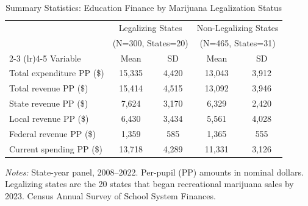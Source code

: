 
\begin{table}[htbp]
\centering
\caption{Summary Statistics: Education Finance by Marijuana Legalization Status}
\label{tab:summary}
\small
\begin{tabular}{lcccc}
\hline\hline
 & \multicolumn{2}{c}{Legalizing States} & \multicolumn{2}{c}{Non-Legalizing States} \\
 & \multicolumn{2}{c}{(N=300, States=20)} & \multicolumn{2}{c}{(N=465, States=31)} \\
\cmidrule(lr){2-3} \cmidrule(lr){4-5}
Variable & Mean & SD & Mean & SD \\
\hline
Total expenditure PP (\$) & 15,335 & 4,420 & 13,043 & 3,912 \\
Total revenue PP (\$) & 15,414 & 4,515 & 13,092 & 3,946 \\
State revenue PP (\$) & 7,624 & 3,170 & 6,329 & 2,420 \\
Local revenue PP (\$) & 6,430 & 3,434 & 5,561 & 4,028 \\
Federal revenue PP (\$) & 1,359 & 585 & 1,365 & 555 \\
Current spending PP (\$) & 13,718 & 4,289 & 11,331 & 3,126 \\
\hline\hline
\end{tabular}
\begin{tablenotes}
\small
\item \textit{Notes:} State-year panel, 2008--2022. Per-pupil (PP) amounts in nominal dollars. Legalizing states are the 20 states that began recreational marijuana sales by 2023. Census Annual Survey of School System Finances.
\end{tablenotes}
\end{table}

